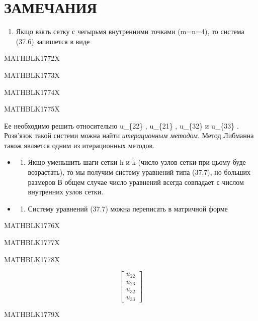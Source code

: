 \documentclass[
  ukrainian,
]{article}
\providecommand{\tightlist}{%
  \setlength{\itemsep}{0pt}\setlength{\parskip}{0pt}}
\begin{document}
\section{ЗАМЕЧАНИЯ}\label{ux437ux430ux43cux435ux447ux430ux43dux438ux44f-9}

\begin{enumerate}
\def\labelenumi{\arabic{enumi}.}
\tightlist
\item
  Якщо взять сетку с чегырьмя внутренними точками (m=n=4), то система
  (37.6) запишется в виде
\end{enumerate}

MATHBLK1772X

MATHBLK1773X

MATHBLK1774X

MATHBLK1775X

Ее необходимо решить относительно u\_\{22\} , u\_\{21\} , u\_\{32\} и
u\_\{33\} . Розв'язок такой системи можна найти \emph{итерационным
методом}. Метод Либманна також является одним из итерационных методов.

\begin{itemize}
\tightlist
\item
  \begin{enumerate}
  \def\labelenumi{\arabic{enumi}.}
  \setcounter{enumi}{1}
  \tightlist
  \item
    Якщо уменьшить шаги сетки h и k (число узлов сетки при цьому буде
    возрастать), то мы получим систему уравнений типа (37.7), но больших
    размеров В общем случае число уравнений всегда совпадает с числом
    внутренних узлов сетки.
  \end{enumerate}
\item
  \begin{enumerate}
  \def\labelenumi{\arabic{enumi}.}
  \setcounter{enumi}{2}
  \tightlist
  \item
    Систему уравнений (37.7) можна переписать в матричной форме
  \end{enumerate}
\end{itemize}

MATHBLK1776X

MATHBLK1777X

MATHBLK1778X

\[
\begin{bmatrix} u_{22} \\ u_{23} \\ u_{32} \\ u_{33} \end{bmatrix}
\]

MATHBLK1779X
\end{document}
